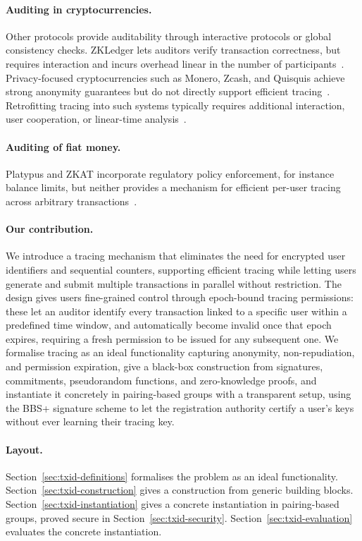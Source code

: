 \paragraph{Auditing in cryptocurrencies.} Other protocols provide auditability
through interactive protocols or global consistency checks. ZKLedger lets
auditors verify transaction correctness, but requires interaction and incurs
overhead linear in the number of participants~\cite{EPRINT:NarVasVir18}.
Privacy-focused cryptocurrencies such as Monero, Zcash, and Quisquis achieve
strong anonymity guarantees but do not directly support efficient
tracing~\cite{EPRINT:Noether15,SP:BCGGMT14,AC:FMMO19,FC:BAZB20}.  Retrofitting
tracing into such systems typically requires additional interaction, user
cooperation, or linear-time analysis~\cite{ACNS:PBGP25}.

\paragraph{Auditing of fiat money.} Platypus and ZKAT incorporate regulatory
policy enforcement, for instance balance limits, but neither provides a
mechanism for efficient per-user tracing across arbitrary
transactions~\cite{CCS:WKDC22,EPRINT:ACDDET19}.

\paragraph{Our contribution.} We introduce a tracing mechanism that eliminates
the need for encrypted user identifiers and sequential counters, supporting
efficient tracing while letting users generate and submit multiple transactions
in parallel without restriction. The design gives users fine-grained control
through epoch-bound tracing permissions: these let an auditor identify every
transaction linked to a specific user within a predefined time window, and
automatically become invalid once that epoch expires, requiring a fresh
permission to be issued for any subsequent one. We formalise tracing as an
ideal functionality capturing anonymity, non-repudiation, and permission
expiration, give a black-box construction from signatures, commitments,
pseudorandom functions, and zero-knowledge proofs, and instantiate it
concretely in pairing-based groups with a transparent setup, using the BBS+
signature scheme to let the registration authority certify a user's keys
without ever learning their tracing key.

\paragraph{Layout.} Section~\ref{sec:txid-definitions} formalises the problem
as an ideal functionality. Section~\ref{sec:txid-construction} gives a
construction from generic building blocks.
Section~\ref{sec:txid-instantiation} gives a concrete instantiation in
pairing-based groups, proved secure in Section~\ref{sec:txid-security}.
Section~\ref{sec:txid-evaluation} evaluates the concrete instantiation.
